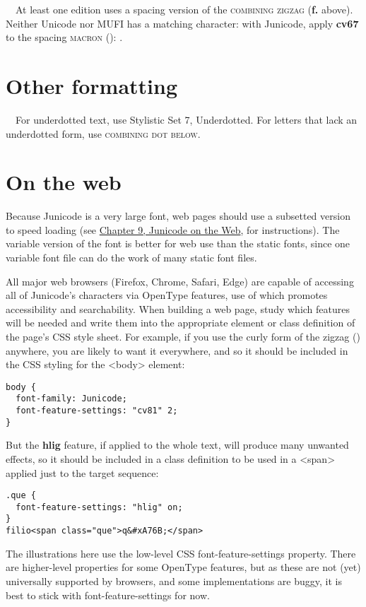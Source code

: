 \noindent{}\ \ At least one edition uses a spacing version of the \textsc{combining zigzag}
(\textbf{f.} above).
Neither Unicode nor MUFI has a matching character: with Junicode, apply \textbf{cv67} to the spacing
\textsc{macron} (): .

\section[Other formatting]{Other formatting}
\ \ For underdotted text, use Stylistic Set 7, Underdotted. For letters that lack an underdotted form, use  \textsc{combining dot below}.

\section[On the web]{On the web}
Because Junicode is a very large font, web pages should use a subsetted version to speed loading
(see \hyperlink{OnTheWeb}{Chapter 9, Junicode on the Web}, for instructions).
The variable version of the font is better for web use than the
static fonts, since one variable font file can do the work of many static font files.

All major web browsers (Firefox, Chrome, Safari, Edge) are capable of accessing all of Junicode's characters via
OpenType features, use of which promotes accessibility and searchability. When building a web page, study which
features will be needed and write them into the appropriate element or class definition of the page's CSS style sheet.
For example, if you use the curly form of the zigzag () anywhere, you are likely to want it everywhere, and so it
should be included in the CSS styling for the <body> element:
\begin{verbatim}
body {
  font-family: Junicode;
  font-feature-settings: "cv81" 2;
}
\end{verbatim}

\noindent But the \textbf{hlig} feature, if applied to the whole text, will produce many unwanted effects, so it should be
included in a class definition to be used in a <span> applied just to the target sequence:
\begin{verbatim}
.que {
  font-feature-settings: "hlig" on;
}
filio<span class="que">q&#xA76B;</span>
\end{verbatim}

\noindent The illustrations here use the low-level CSS font-feature-settings property.
There are higher-level properties for some
OpenType features, but as these are not (yet) universally supported by browsers, and some implementations are buggy, it
is best to stick with font-feature-settings for now.

